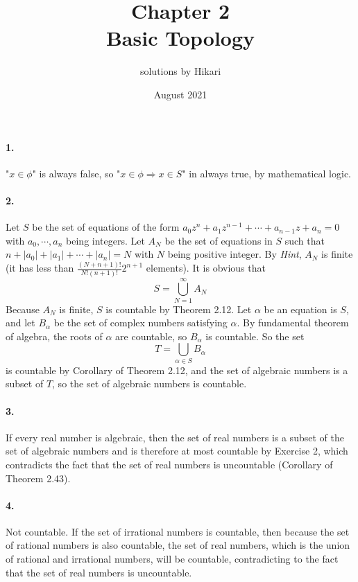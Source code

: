 \documentclass[a4paper]{article}
\title{Chapter 2\\ Basic Topology}
\author{solutions by Hikari}
\date{August 2021}
\begin{document}
\newcommand{\V}{\mathbf}

\maketitle

\paragraph{1.}
"$x\in\phi $" is always false, so "$x\in\phi \Rightarrow x\in S$" in always true, by mathematical logic.

\paragraph{2.}
Let $S$ be the set of equations of the form $a_0z^n+a_1z^{n-1}+\cdots+a_{n-1}z+a_n=0$ with $a_0,\cdots,a_n$ being integers. Let $A_N$ be the set of equations in $S$ such that $n+|a_0|+|a_1|+\cdots+|a_n|=N$ with $N$ being positive integer. By \textit{Hint}, $A_N$ is finite (it has less than $\frac{(N+n+1)!}{N!(n+1)!}2^{n+1}$ elements). It is obvious that
\[
S=\bigcup_{N=1}^\infty A_N
\]
Because $A_N$ is finite, $S$ is countable by Theorem 2.12. Let $\alpha$ be an equation is $S$, and let $B_\alpha$ be the set of complex numbers satisfying $\alpha$. By fundamental theorem of algebra, the roots of $\alpha$ are countable, so $B_\alpha$ is countable. So the set
\[
T=\bigcup_{\alpha\in S}B_\alpha
\]
is countable by Corollary of Theorem 2.12, and the set of algebraic numbers is a subset of $T$, so the set of algebraic numbers is countable.

\paragraph{3.}
If every real number is algebraic, then the set of real numbers is a subset of the set of algebraic numbers and is therefore at most countable by Exercise 2, which contradicts the fact that the set of real numbers is uncountable (Corollary of Theorem 2.43).

\paragraph{4.}
Not countable. If the set of irrational numbers is countable, then because the set of rational numbers is also countable, the set of real numbers, which is the union of rational and irrational numbers, will be countable, contradicting to the fact that the set of real numbers is uncountable.
\end{document}

